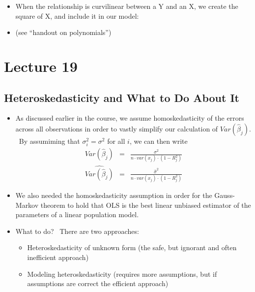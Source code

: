 \documentclass[11pt]{article}
\begin{document}
\begin{itemize}
\item When the relationship is curvilinear between a Y and an X, we create
the square of X, and include it in our model:

\item (see \textquotedblleft handout on polynomials\textquotedblright )
\end{itemize}

\section{Lecture 19}

\subsection{Heteroskedasticity and What to Do About It}

\begin{itemize}
\item As discussed earlier in the course, we assume homoskedasticity of the
errors across all observations in order to vastly simplify our calculation
of $Var\left( \widehat{\beta }_{j}\right) .$ \ By assumiming that $\sigma
_{i}^{2}=\sigma ^{2}$ for all $i$, we can then write 
\begin{eqnarray*}
Var\left( \widehat{\beta }_{j}\right) &=&\frac{\sigma ^{2}}{n\cdot
var(x_{j})\cdot \left( 1-R_{j}^{2}\right) } \\
\widehat{Var\left( \widehat{\beta }_{j}\right) } &=&\frac{\widehat{\sigma }%
^{2}}{n\cdot var(x_{j})\cdot \left( 1-R_{j}^{2}\right) }
\end{eqnarray*}

\item We also needed the homoskedasticity assumption in order for the
Gauss-Markov theorem to hold that OLS is the best linear unbiased estimator
of the parameters of a linear population model.

\item What to do? \ There are two approaches:

\begin{itemize}
\item Heteroskedasticity of unknown form (the safe, but ignorant and often
inefficient approach)

\item Modeling heteroskedasticity (requires more assumptions, but if
assumptions are correct the efficient approach)
\end{itemize}
\end{itemize}
\end{document}
